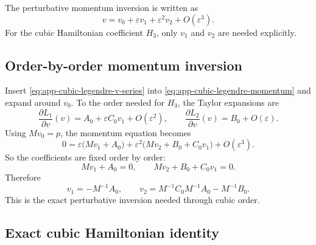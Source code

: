 \documentclass[11pt]{article}
\begin{document}
The perturbative momentum inversion is written as
\begin{equation}
v=v_0+\varepsilon v_1+\varepsilon^2v_2+O(\varepsilon^3).
\label{eq:app-cubic-legendre-v-series}
\end{equation}
For the cubic Hamiltonian coefficient \(H_3\), only \(v_1\) and \(v_2\) are
needed explicitly.

\subsection{Order-by-order momentum inversion}
\label{app:cubic-legendre-inversion}

Insert \eqref{eq:app-cubic-legendre-v-series} into
\eqref{eq:app-cubic-legendre-momentum} and expand around \(v_0\).  To the order
needed for \(H_3\), the Taylor expansions are
\begin{equation}
\frac{\partial L_1}{\partial v}(v)
=
A_0 + \varepsilon C_0 v_1 + O(\varepsilon^2),
\qquad
\frac{\partial L_2}{\partial v}(v)
=
B_0 + O(\varepsilon).
\label{eq:app-cubic-legendre-taylor}
\end{equation}
Using \(Mv_0=p\), the momentum equation becomes
\begin{equation}
0
=\varepsilon\bigl(Mv_1+A_0\bigr)
+\varepsilon^2\bigl(Mv_2+B_0+C_0v_1\bigr)
+O(\varepsilon^3).
\label{eq:app-cubic-legendre-momentum-orders}
\end{equation}
So the coefficients are fixed order by order:
\begin{equation}
Mv_1+A_0=0,
\qquad
Mv_2+B_0+C_0v_1=0.
\label{eq:app-cubic-legendre-order-eqs}
\end{equation}
Therefore
\begin{equation}
\boxed{
v_1=-M^{-1}A_0,
\qquad
v_2=M^{-1}C_0M^{-1}A_0-M^{-1}B_0.
}
\label{eq:app-cubic-legendre-v1v2}
\end{equation}
This is the exact perturbative inversion needed through cubic order.

\subsection{Exact cubic Hamiltonian identity}
\label{app:cubic-legendre-identity}
\end{document}
